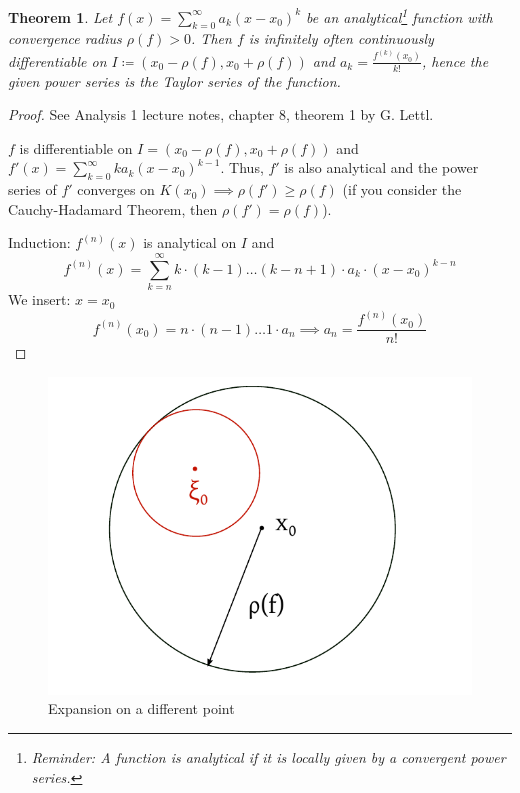 \documentclass{article}
\newtheorem{theorem}{Theorem}  \numberwithin{theorem}{section}
\begin{document}
\begin{theorem} %
  Let $f(x) = \sum_{k=0}^\infty a_k (x - x_0)^k$ be an analytical\footnote{Reminder: A function is analytical if it is locally given by a convergent power series.} function with convergence radius $\rho(f) > 0$.
  Then $f$ is infinitely often continuously differentiable on $I \coloneqq (x_0 - \rho(f), x_0 + \rho(f))$
  and $a_k = \frac{f^{(k)}(x_0)}{k!}$, hence the given power series is the Taylor series of the function.
\end{theorem}

\begin{proof}
  See Analysis 1 lecture notes, chapter 8, theorem 1 by G. Lettl.

  $f$ is differentiable on $I = (x_0 - \rho(f), x_0 + \rho(f))$ and $f'(x) = \sum_{k=0}^\infty k a_k (x - x_0)^{k-1}$.
  Thus, $f'$ is also analytical and the power series of $f'$ converges on $K(x_0) \implies \rho(f') \geq \rho(f)$
  (if you consider the Cauchy-Hadamard Theorem, then $\rho(f') = \rho(f)$).

  Induction:
  $f^{(n)}(x)$ is analytical on $I$ and
  \[ f^{(n)}(x) = \sum_{k=n}^\infty k \cdot (k - 1) \dots (k - n + 1) \cdot a_k \cdot (x - x_0)^{k-n} \]
  We insert: $x = x_0$
  \[ f^{(n)}(x_0) = n \cdot (n - 1) \dots 1 \cdot a_n \implies a_n = \frac{f^{(n)}(x_0)}{n!} \]
\end{proof}

\begin{figure}[t]
  \begin{center}
    \includegraphics{img/29_expansion_on_a_different_point.pdf}
    \caption{Expansion on a different point}
    \label{img:expan}
  \end{center}
\end{figure}
\end{document}
